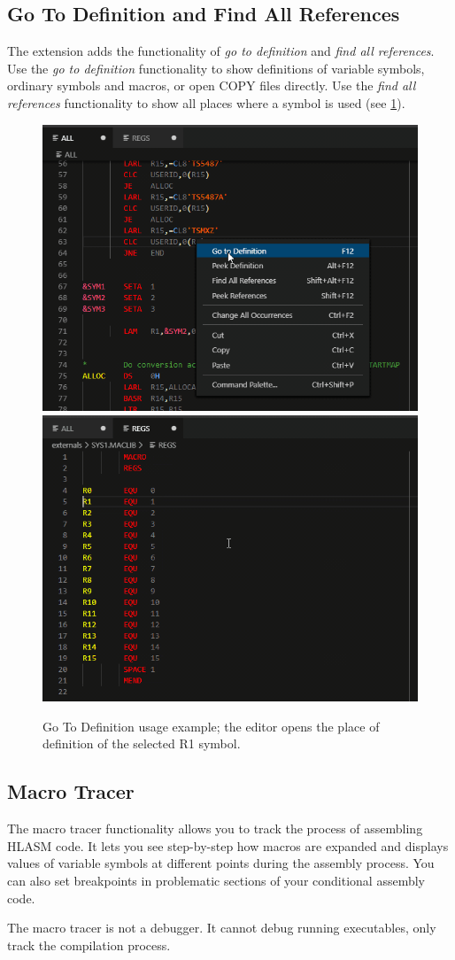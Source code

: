 \subsection{Go To Definition and Find All References}
The extension adds the functionality of \emph{go to definition} and \emph{find all references}. Use the \emph{go to definition} functionality to show definitions of variable symbols, ordinary symbols and macros, or open COPY files directly. Use the \emph{find all references} functionality to show all places where a symbol is used (see \cref{fig:goto}).

\begin{figure}
	\centering
	\includegraphics[width=.45\linewidth]{img/go_to_def/go_to_def-54}
	\includegraphics[width=.45\linewidth]{img/go_to_def/go_to_def-56}
	\caption{Go To Definition usage example; the editor opens the place of definition of the selected R1 symbol.}
	\label{fig:goto}
\end{figure}

\subsection{Macro Tracer}
The macro tracer functionality allows you to track the process of assembling HLASM code. It lets you see step-by-step how macros are expanded and displays values of variable symbols at different points during the assembly process. You can also set breakpoints in problematic sections of your conditional assembly code. 

The macro tracer is not a debugger. It cannot debug running executables, only track the compilation process.

